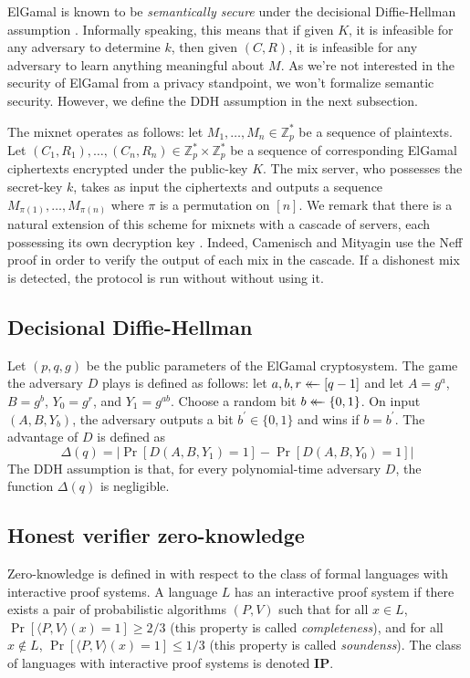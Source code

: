 \documentclass[letter]{article}
\newcommand{\Zmodp}{\mathbb{Z}_p}
\newcommand{\bits}{\{0,1\}}
\newcommand*\by{\times}
\newcommand{\getsr}{\mathrel{\leftarrow\mkern-14mu\leftarrow}}
\newcommand{\brackets}[1]{\langle #1 \rangle}
\newcommand{\class}[1]{\mathbf{#1}}
\newcommand{\pk}{K}
\newcommand{\sk}{k}
\newcommand{\varm}{M}
\newcommand{\varc}{C}
\newcommand{\varr}{R}
\newcommand{\advD}{D}
\begin{document}
ElGamal is known to be \textit{semantically secure} under the
decisional Diffie-Hellman assumption \cite{elgamal84,ty98}. Informally speaking, this
means that if given $\pk$, it is infeasible for any adversary to determine
$\sk$, then given $(C,R)$, it is infeasible for any adversary to
learn anything meaningful about $M$. As we're not
interested in the security of ElGamal from a privacy standpoint, we won't
formalize semantic security. However, we define the DDH assumption in the next
subsection.

The mixnet operates as follows:
let $\varm_1, \ldots, \varm_n \in \Zmodp^*$ be a sequence of plaintexts.
Let $(\varc_1, \varr_1), \ldots, (\varc_n, \varr_n) \in \Zmodp^* \by \Zmodp^*$ be a
sequence of corresponding ElGamal ciphertexts encrypted under the public-key
$\pk$. The mix server, who possesses the secret-key $\sk$, takes as input
the ciphertexts and outputs a sequence $\varm_{\pi(1)}, \ldots, \varm_{\pi(n)}$
where $\pi$ is a permutation on $[n]$.
We remark that there is a natural extension of this scheme for mixnets with a
cascade of servers, each possessing its own decryption key \cite{cm06}. Indeed,
Camenisch and Mityagin use the Neff proof in order to verify the output of each
mix in the cascade. If a dishonest mix is detected, the protocol is run without
without using it.

\subsection{Decisional Diffie-Hellman} \label{sec-ddh}

Let $(p, q, g)$ be the public parameters of the ElGamal cryptosystem. The game
the adversary $\advD$ plays is defined as follows: let $a, b, r \getsr
[q-1]$ and let $A = g^a$, $B = g^b$, $Y_0 = g^r$, and $Y_1 = g^{ab}$. Choose
a random bit $b \getsr \bits$. On input $(A, B, Y_b)$, the adversary outputs a
bit $b^\prime \in \bits$ and wins if $b=b^\prime$. The advantage of $\advD$ is
defined as
\[
  \Delta(q) = |\Pr[\advD(A, B, Y_1)=1] - \Pr[\advD(A, B, Y_0)=1]|
\]
The DDH assumption is that, for every polynomial-time adversary $\advD$, the
function $\Delta(q)$ is negligible.

\subsection{Honest verifier zero-knowledge}

Zero-knowledge is defined in \cite{goldreich} with respect to the class of
formal languages with interactive proof systems. A language $L$ has an
interactive proof system if there exists a pair of probabilistic algorithms $(P,
V)$ such that for all $x \in L$, $\Pr[\brackets{P, V}(x) = 1] \ge 2/3$
(this property is called \emph{completeness}), and for all
$x \not\in L$, $\Pr[\brackets{P, V}(x) = 1] \le 1/3$ (this property is called
\emph{soundenss}). The class of languages
with interactive proof systems is denoted $\class{IP}$.
\end{document}
